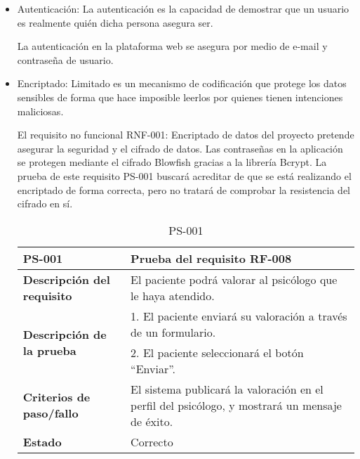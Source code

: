 \begin{itemize}
\item Autenticación: La autenticación es la capacidad de demostrar que un usuario es realmente quién dicha persona asegura ser.



La autenticación en la plataforma web se asegura por medio de e-mail y contraseña de usuario.


\item Encriptado: Limitado es un mecanismo de codificación que protege los datos sensibles de forma que hace imposible leerlos por quienes tienen intenciones maliciosas.


El requisito no funcional RNF-001: Encriptado de datos del proyecto pretende asegurar la seguridad y el cifrado de datos. Las contraseñas en la aplicación se protegen mediante el cifrado Blowfish gracias a la librería Bcrypt. La prueba de este requisito PS-001 buscará acreditar de que se está realizando el encriptado de forma correcta, pero no tratará de comprobar la resistencia del cifrado en sí.


\begin{table}[htpb]
\centering
\begin{tabularx}{\textwidth}{|l|X|}
\hline
\rowcolor[gray]{0.9}\textbf{PS-001}                                     & \textbf{Prueba del requisito RF-008}                                                           \\ \hline
\textbf{Descripción del requisito}                 & El paciente podrá valorar al psicólogo que le haya atendido.                                   \\ \hline
\multirow{2}{*}{\textbf{Descripción de la prueba}} & 1. El paciente enviará su valoración a través de un formulario.                                \\ \cline{2-2} 
                                                   & 2. El paciente seleccionará el botón ``Enviar''.                                                 \\ \hline
\textbf{Criterios de paso/fallo}                   & El sistema publicará la valoración en el perfil del psicólogo, y mostrará un mensaje de éxito. \\ \hline
\textbf{Estado}                                    & Correcto                                                                                       \\ \hline
\end{tabularx}
\caption{PS-001}
\end{table}


\end{itemize}


